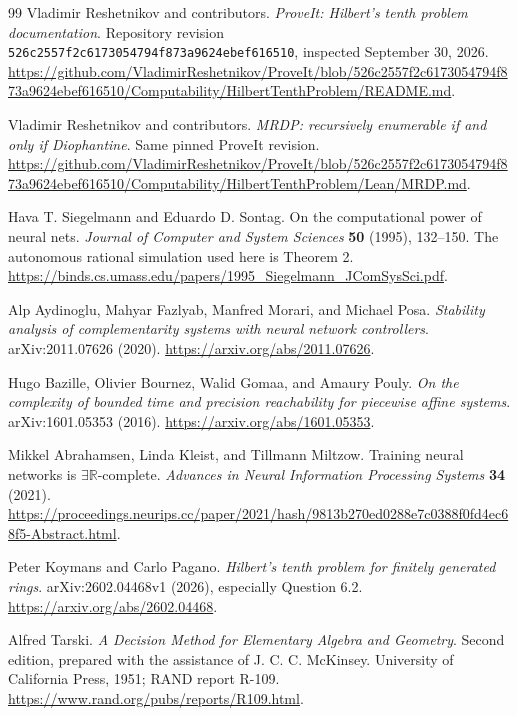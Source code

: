 \documentclass[11pt,letterpaper]{article}
\numberwithin{equation}{section}
\theoremstyle{definition}
\theoremstyle{remark}
\newcommand{\R}{\mathbb R}
\begin{document}
\begin{thebibliography}{99}
Vladimir Reshetnikov and contributors.
\emph{ProveIt: Hilbert's tenth problem documentation}.
Repository revision \texttt{526c2557f2c6173054794f873a9624ebef616510},
inspected September 30, 2026.
\url{https://github.com/VladimirReshetnikov/ProveIt/blob/526c2557f2c6173054794f873a9624ebef616510/Computability/HilbertTenthProblem/README.md}.

Vladimir Reshetnikov and contributors.
\emph{MRDP: recursively enumerable if and only if Diophantine}.
Same pinned ProveIt revision.
\url{https://github.com/VladimirReshetnikov/ProveIt/blob/526c2557f2c6173054794f873a9624ebef616510/Computability/HilbertTenthProblem/Lean/MRDP.md}.

Hava T. Siegelmann and Eduardo D. Sontag.
On the computational power of neural nets.
\emph{Journal of Computer and System Sciences} \textbf{50} (1995), 132--150.
The autonomous rational simulation used here is Theorem 2.
\url{https://binds.cs.umass.edu/papers/1995_Siegelmann_JComSysSci.pdf}.

Alp Aydinoglu, Mahyar Fazlyab, Manfred Morari, and Michael Posa.
\emph{Stability analysis of complementarity systems with neural network controllers}.
arXiv:2011.07626 (2020).
\url{https://arxiv.org/abs/2011.07626}.

Hugo Bazille, Olivier Bournez, Walid Gomaa, and Amaury Pouly.
\emph{On the complexity of bounded time and precision reachability for piecewise affine systems}.
arXiv:1601.05353 (2016).
\url{https://arxiv.org/abs/1601.05353}.

Mikkel Abrahamsen, Linda Kleist, and Tillmann Miltzow.
Training neural networks is $\exists\R$-complete.
\emph{Advances in Neural Information Processing Systems} \textbf{34} (2021).
\url{https://proceedings.neurips.cc/paper/2021/hash/9813b270ed0288e7c0388f0fd4ec68f5-Abstract.html}.

Peter Koymans and Carlo Pagano.
\emph{Hilbert's tenth problem for finitely generated rings}.
arXiv:2602.04468v1 (2026), especially Question 6.2.
\url{https://arxiv.org/abs/2602.04468}.

Alfred Tarski.
\emph{A Decision Method for Elementary Algebra and Geometry}.
Second edition, prepared with the assistance of J. C. C. McKinsey.
University of California Press, 1951; RAND report R-109.
\url{https://www.rand.org/pubs/reports/R109.html}.


\end{thebibliography}
\end{document}
